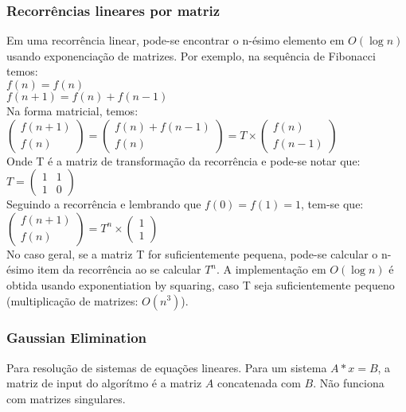 \divisor

\subsubsection{Recorrências lineares por matriz}
Em uma recorrência linear, pode-se encontrar o n-ésimo elemento em $O(\log{n})$ usando exponenciação de matrizes. Por exemplo, na sequência de Fibonacci temos:
\\ $f(n) = f(n)$
\\ $f(n+1) = f(n)+f(n-1)$
\\Na forma matricial, temos:
\\
$\left( \begin{array}{c}
f(n+1) \\
f(n) \end{array} \right)
 = 
\left( \begin{array}{c}
f(n) + f(n-1) \\
f(n) \end{array} \right)
 = T \times
\left( \begin{array}{c}
f(n) \\
f(n-1) \end{array} \right)$
\\ Onde T é a matriz de transformação da recorrência e pode-se notar que:
$T=\left( \begin{array}{cc}
1 & 1 \\
1 & 0 \end{array} \right)$
\\ Seguindo a recorrência e lembrando que $f(0) = f(1) = 1$, tem-se que:
\\$\left( \begin{array}{c}
f(n+1) \\
f(n) \end{array} \right) = T^n \times
\left( \begin{array}{c}
1 \\
1 \end{array} \right)$
\\ No caso geral, se a matriz T for suficientemente pequena, pode-se calcular o n-ésimo item da recorrência ao se calcular $T^n$. A implementação em $O(\log{n})$ é obtida usando exponentiation by squaring, caso T seja suficientemente pequeno (multiplica\c{c}\~{a}o de matrizes: $O(n^3)$).

\divisor
\subsubsection{Gaussian Elimination}
Para resolu\c{c}\~{a}o de sistemas de equa\c{c}\~{o}es lineares. Para um sistema $A*x = B$, a matriz de input do algor\'{i}tmo \'{e} a matriz $A$ concatenada com $B$.
N\~{a}o funciona com matrizes singulares.
\divisor
